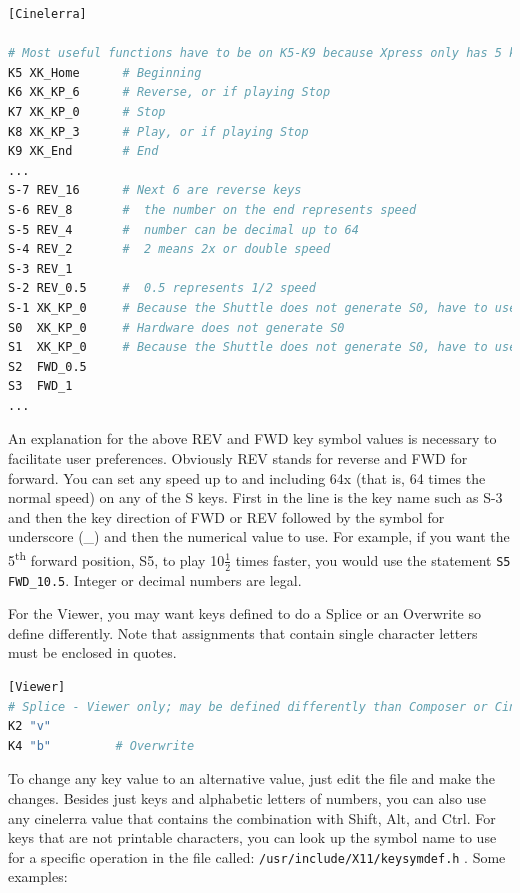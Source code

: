 \begin{lstlisting}[language=Bash]
[Cinelerra] 

# Most useful functions have to be on K5-K9 because Xpress only has 5 keys 
K5 XK_Home      # Beginning 
K6 XK_KP_6      # Reverse, or if playing Stop 
K7 XK_KP_0      # Stop 
K8 XK_KP_3      # Play, or if playing Stop 
K9 XK_End       # End 
... 
S-7 REV_16     	# Next 6 are reverse keys 
S-6 REV_8      	#  the number on the end represents speed
S-5 REV_4      	#  number can be decimal up to 64 
S-4 REV_2      	#  2 means 2x or double speed 
S-3 REV_1 
S-2 REV_0.5    	#  0.5 represents 1/2 speed 
S-1 XK_KP_0    	# Because the Shuttle does not generate S0, have to use S-1 
S0  XK_KP_0   	# Hardware does not generate S0 
S1  XK_KP_0   	# Because the Shuttle does not generate S0, have to use S1 
S2  FWD_0.5 
S3  FWD_1 
... 
\end{lstlisting}

\noindent An explanation for the above REV and FWD key symbol values is necessary to facilitate user preferences.  Obviously REV stands for reverse and FWD for forward.  You can set any speed up to and including 64x (that is, 64 times the normal speed) on any of the S keys.  First in the line is the key name such as S-3 and then the key direction of FWD or REV followed by the symbol for underscore (\_) and then the numerical value to use.  For example, if you want the 5\textsuperscript{th} forward position, S5, to play 10$ \frac{1}{2}$ times faster, you would use the statement \texttt{S5 FWD\_10.5}.  Integer or decimal numbers are legal.

For the Viewer, you may want keys defined to do a Splice or an Overwrite so define differently.  Note that assignments that contain single character letters must be enclosed in quotes.

\begin{lstlisting}[language=Bash]
[Viewer] 
# Splice - Viewer only; may be defined differently than Composer or Cinelerra 
K2 "v"         
K4 "b"         # Overwrite
\end{lstlisting}

\noindent To change any key value to an alternative value, just edit the file and make the changes.  Besides just keys and alphabetic letters of numbers, you can also use any cinelerra value that contains the combination with Shift, Alt, and Ctrl.  For keys that are not printable characters, you can look up the symbol name to use for a specific operation in the file called: \texttt{/usr/include/X11/keysymdef.h} .
\noindent Some examples:

